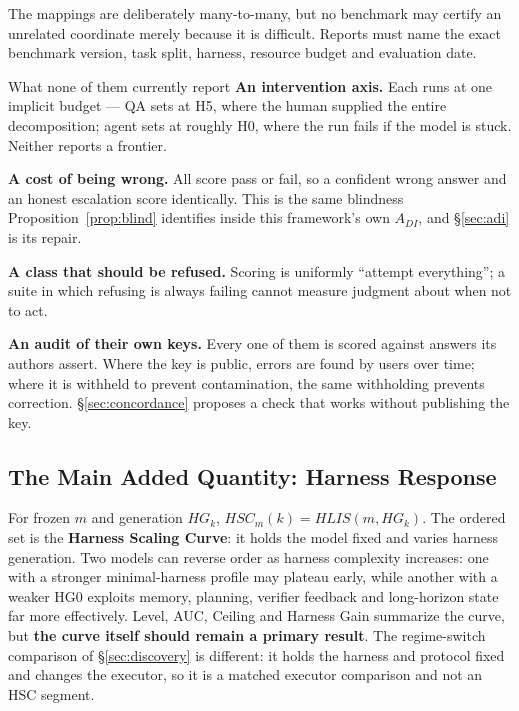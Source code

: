 The mappings are deliberately many-to-many, but no benchmark may certify an unrelated coordinate merely because it is difficult. Reports must name the exact benchmark version, task split, harness, resource budget and evaluation date.

\begin{claimbox}{What none of them currently report}
\textbf{An intervention axis.} Each runs at one implicit budget --- QA sets at H5, where the human supplied the entire decomposition; agent sets at roughly H0, where the run fails if the model is stuck. Neither reports a frontier.

\textbf{A cost of being wrong.} All score pass or fail, so a confident wrong answer and an honest escalation score identically. This is the same blindness Proposition~\ref{prop:blind} identifies inside this framework's own $A_{DI}$, and \S\ref{sec:adi} is its repair.

\textbf{A class that should be refused.} Scoring is uniformly ``attempt everything''; a suite in which refusing is always failing cannot measure judgment about when not to act.

\textbf{An audit of their own keys.} Every one of them is scored against answers its authors assert. Where the key is public, errors are found by users over time; where it is withheld to prevent contamination, the same withholding prevents correction. \S\ref{sec:concordance} proposes a check that works without publishing the key.
\end{claimbox}

\subsection{The Main Added Quantity: Harness Response}

For frozen $m$ and generation $HG_k$, $HSC_m(k) = HLIS(m,HG_k)$. The ordered set is the \textbf{Harness Scaling Curve}: it holds the model fixed and varies harness generation. Two models can reverse order as harness complexity increases: one with a stronger minimal-harness profile may plateau early, while another with a weaker HG0 exploits memory, planning, verifier feedback and long-horizon state far more effectively. Level, AUC, Ceiling and Harness Gain summarize the curve, but \textbf{the curve itself should remain a primary result}. The regime-switch comparison of \S\ref{sec:discovery} is different: it holds the harness and protocol fixed and changes the executor, so it is a matched executor comparison and not an HSC segment.

